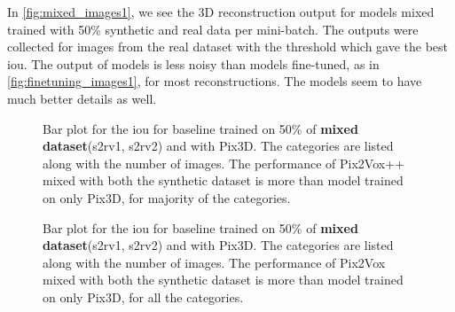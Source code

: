 In \autoref{fig:mixed_images1}, we see the 3D reconstruction output for models mixed trained with 50\% synthetic and real data per mini-batch.
The outputs were collected for images from the real dataset with the threshold which gave the best \gls{iou}.
The output of models is less noisy than models fine-tuned, as in \autoref{fig:finetuning_images1}, for most reconstructions.
The models seem to have much better details as well.


\begin{figure}
    \centering
    \resizebox{0.7\textwidth}{!}{}
    \caption{Bar plot for the \gls{iou} for baseline  trained on 50\% of \textbf{mixed dataset}(\gls{s2rv1}, \gls{s2rv2}) and with Pix3D.
    The categories are listed along with the number of images.
    The performance of Pix2Vox++ mixed with both the synthetic dataset is more than model trained on only Pix3D, for majority of the categories.
    }
    \label{fig:mixed2}
\end{figure}


\begin{figure}
    \centering
    \resizebox{0.7\textwidth}{!}{}
    \caption{Bar plot for the \gls{iou} for baseline  trained on 50\% of \textbf{mixed dataset}(\gls{s2rv1}, \gls{s2rv2}) and with Pix3D.
    The categories are listed along with the number of images.
    The performance of Pix2Vox mixed with both the synthetic dataset is more than model trained on only Pix3D, for all the categories.}
    \label{fig:mixed3}
\end{figure}


